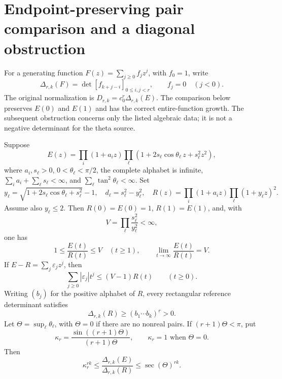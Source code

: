 
\section{Endpoint-preserving pair comparison and a diagonal obstruction}
\label{sec:pair-comparison}

For a generating function $F(z)=\sum_{j\ge0}f_jz^j$, with $f_0=1$,
write
\[
 \Delta_{r,k}(F)=\det[f_{k+j-i}]_{0\le i,j<r},\qquad f_j=0\quad(j<0).
\]
The original normalization is $D_{r,k}=c_0^r\Delta_{r,k}(E)$.
The comparison below preserves $E(0)$ and $E(1)$ and has the correct
entire-function growth. The subsequent obstruction concerns only the
listed algebraic data; it is not a negative determinant for the theta
source.

\begin{proposition}
\label{prop:endpoint-pair}
Suppose
\[
 E(z)=\prod_i(1+a_i z)\prod_\ell
       (1+2s_\ell\cos\theta_\ell\,z+s_\ell^2z^2),
\]
where $a_i,s_\ell>0$, $0<\theta_\ell<\pi/2$, the complete alphabet is
infinite, $\sum_i a_i+\sum_\ell s_\ell<\infty$, and
$\sum_\ell\tan^2\theta_\ell<\infty$.
Set
\[
 y_\ell=\sqrt{1+2s_\ell\cos\theta_\ell+s_\ell^2}-1,
 \quad d_\ell=s_\ell^2-y_\ell^2,
 \quad
 R(z)=\prod_i(1+a_i z)\prod_\ell(1+y_\ell z)^2.
\]
Assume also $y_\ell\le2$. Then $R(0)=E(0)=1$, $R(1)=E(1)$, and,
with
\[
 V=\prod_\ell\frac{s_\ell^2}{y_\ell^2}<\infty,
\]
one has
\[
 1\le\frac{E(t)}{R(t)}\le V\quad(t\ge1),
 \qquad \lim_{t\to\infty}\frac{E(t)}{R(t)}=V.
\]
If $E-R=\sum_j\varepsilon_jz^j$, then
\begin{equation}
 \sum_{j\ge0}|\varepsilon_j|t^j\le(V-1)R(t)
 \qquad(t\ge0).
 \label{eq:pair-coeff-payment}
\end{equation}
Writing $(b_j)$ for the positive alphabet of $R$, every rectangular
reference determinant satisfies
\begin{equation}
 \Delta_{r,k}(R)\ge(b_1\cdots b_k)^r>0.
 \label{eq:pair-reference-margin}
\end{equation}
Let $\Theta=\sup_\ell\theta_\ell$, with $\Theta=0$ if there are no
nonreal pairs. If $(r+1)\Theta<\pi$, put
\[
 \kappa_r=\frac{\sin((r+1)\Theta)}{(r+1)\Theta},
 \qquad \kappa_r=1\text{ when }\Theta=0.
\]
Then
\begin{equation}
 \kappa_r^{rk}\le
 \frac{\Delta_{r,k}(E)}{\Delta_{r,k}(R)}
 \le\sec(\Theta)^{rk}.
 \label{eq:pair-sector-margin}
\end{equation}
\end{proposition}

